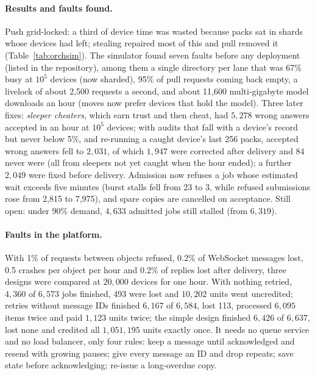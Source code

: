 \documentclass[11pt,a4paper]{article}
\theoremstyle{definition}
\theoremstyle{plain}
\begin{document}
\paragraph{Results and faults found.} Push grid-locked: a third of device time was wasted because packs sat in
shards whose devices had left; stealing repaired most of this and pull removed it (Table~\ref{tab:orchsim}). The
simulator found seven faults before any deployment (listed in the repository), among them a single directory per lane that was 67\% busy at
$10^5$ devices (now sharded), 95\% of pull requests coming back empty, a livelock of about 2{,}500 requests a
second, and about 11{,}600 multi-gigabyte model downloads an hour (moves now prefer devices that hold the
model). Three later fixes: \emph{sleeper cheaters}, which earn trust and then cheat, had $5{,}278$ wrong answers
accepted in an hour at $10^5$ devices; with audits that fall with a device's record but never below 5\%, and
re-running a caught device's last 256 packs, accepted wrong answers fell to $2{,}031$, of which $1{,}947$ were
corrected after delivery and $84$ never were (all from sleepers not yet caught when the hour ended); a further
$2{,}049$ were fixed before delivery. Admission now refuses a job whose estimated wait exceeds five minutes (burst stalls
fell from 23 to 3, while refused submissions rose from 2{,}815 to 7{,}975), and spare copies are cancelled on acceptance. Still open: under 90\% demand, $4{,}633$
admitted jobs still stalled (from $6{,}319$).

\paragraph{Faults in the platform.} With 1\% of requests between objects refused, 0.2\% of WebSocket messages
lost, 0.5 crashes per object per hour and 0.2\% of replies lost after delivery, three designs were compared at
$20{,}000$ devices for one hour. With nothing retried, $4{,}360$ of $6{,}573$ jobs finished, 493 were lost and
$10{,}202$ units went uncredited; retries without message IDs finished $6{,}167$ of $6{,}584$, lost 113, processed
$6{,}095$ items twice and paid $1{,}123$ units twice; the simple design finished $6{,}426$ of $6{,}637$, lost none and
credited all $1{,}051{,}195$ units exactly once. It needs no queue service and no load balancer, only four rules:
keep a message until acknowledged and resend with growing pauses; give every message an ID and drop repeats; save
state before acknowledging; re-issue a long-overdue copy.
\end{document}
